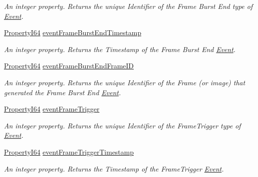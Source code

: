 \begin{DoxyCompactItemize}
\begin{DoxyCompactList}\small\item\em An integer property. Returns the unique Identifier of the Frame Burst End type of \hyperlink{classmv_i_m_p_a_c_t_1_1acquire_1_1_event}{Event}. \end{DoxyCompactList}\item 
\hyperlink{group___common_interface_ga81749b2696755513663492664a18a893}{Property\+I64} \hyperlink{classmv_i_m_p_a_c_t_1_1acquire_1_1_gen_i_cam_1_1_event_control_a9a3c7323088388618d23ecbf363221f3}{event\+Frame\+Burst\+End\+Timestamp}
\begin{DoxyCompactList}\small\item\em An integer property. Returns the Timestamp of the Frame Burst End \hyperlink{classmv_i_m_p_a_c_t_1_1acquire_1_1_event}{Event}. \end{DoxyCompactList}\item 
\hyperlink{group___common_interface_ga81749b2696755513663492664a18a893}{Property\+I64} \hyperlink{classmv_i_m_p_a_c_t_1_1acquire_1_1_gen_i_cam_1_1_event_control_a04c309b663ab1b9c28994c92e19e8b6a}{event\+Frame\+Burst\+End\+Frame\+I\+D}
\begin{DoxyCompactList}\small\item\em An integer property. Returns the unique Identifier of the Frame (or image) that generated the Frame Burst End \hyperlink{classmv_i_m_p_a_c_t_1_1acquire_1_1_event}{Event}. \end{DoxyCompactList}\item 
\hyperlink{group___common_interface_ga81749b2696755513663492664a18a893}{Property\+I64} \hyperlink{classmv_i_m_p_a_c_t_1_1acquire_1_1_gen_i_cam_1_1_event_control_a2b05aba36546d5757ab20027e1ce4cff}{event\+Frame\+Trigger}
\begin{DoxyCompactList}\small\item\em An integer property. Returns the unique Identifier of the Frame\+Trigger type of \hyperlink{classmv_i_m_p_a_c_t_1_1acquire_1_1_event}{Event}. \end{DoxyCompactList}\item 
\hyperlink{group___common_interface_ga81749b2696755513663492664a18a893}{Property\+I64} \hyperlink{classmv_i_m_p_a_c_t_1_1acquire_1_1_gen_i_cam_1_1_event_control_a48c1c46036aa4acd0c45ecc45da45c46}{event\+Frame\+Trigger\+Timestamp}
\begin{DoxyCompactList}\small\item\em An integer property. Returns the Timestamp of the Frame\+Trigger \hyperlink{classmv_i_m_p_a_c_t_1_1acquire_1_1_event}{Event}. \end{DoxyCompactList}\item 

\end{DoxyCompactItemize}
